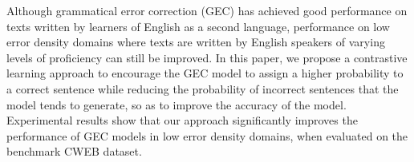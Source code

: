 Although grammatical error correction (GEC) has achieved good performance on texts written by learners of English as a second language, performance on low error density domains where texts are written by English speakers of varying levels of proficiency can still be improved. In this paper, we propose a contrastive learning approach to encourage the GEC model to assign a higher probability to a correct sentence while reducing the probability of incorrect sentences that the model tends to generate, so as to improve the accuracy of the model. Experimental results show that our approach significantly improves the performance of GEC models in low error density domains, when evaluated on the benchmark CWEB dataset.

